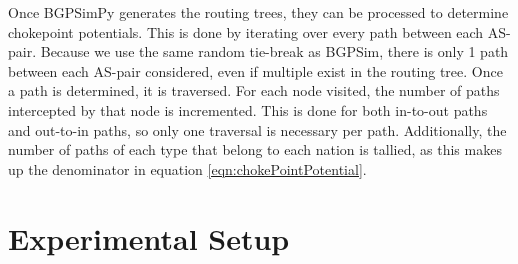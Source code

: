 \documentclass[10pt, conference, letterpaper]{IEEEtran}
\begin{document}
\par
Once BGPSimPy generates the routing trees, they can be processed to determine chokepoint potentials. This is done by iterating over every path between each AS-pair. Because
we use the same random tie-break as BGPSim, there is only 1 path between each AS-pair considered, even if multiple exist in the routing tree. Once a path is determined, it is
traversed. For each node visited, the number of paths intercepted by that node is incremented. This is done for both in-to-out paths and out-to-in paths, so only one traversal is
necessary per path. Additionally, the number of paths of each type that belong to each nation is tallied, as this makes up the denominator in equation \ref{eqn:chokePointPotential}.

\section{Experimental Setup}
\end{document}
